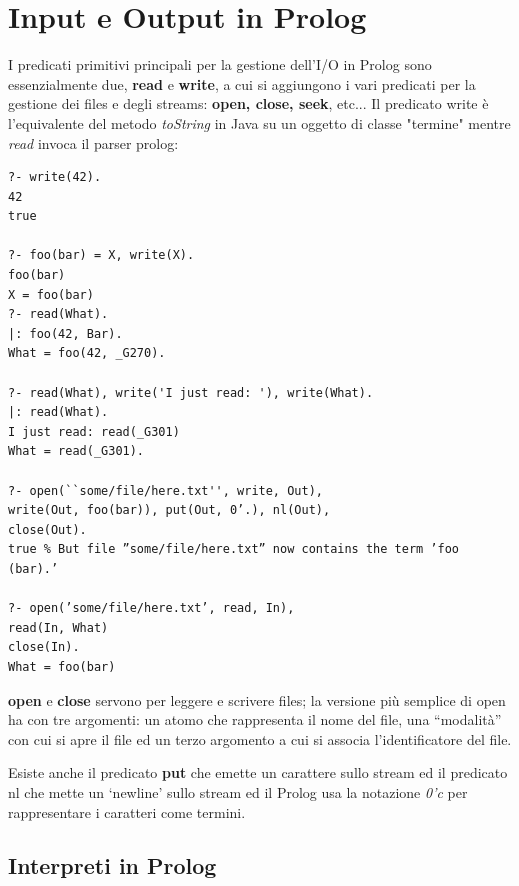 \documentclass[a4paper]{report}
\begin{document}
\section{Input e Output in Prolog}
I predicati primitivi principali per la gestione dell'I/O in Prolog sono essenzialmente due, \textbf{read} e \textbf{write},
a cui si aggiungono i vari predicati per la gestione dei files e degli streams: \textbf{open, close, seek}, etc...
Il predicato write è l'equivalente del metodo \emph{toString} in Java su un oggetto di classe "termine" mentre \emph{read} invoca il parser prolog:
\begin{shaded}
\begin{verbatim}
?- write(42).
42
true

?- foo(bar) = X, write(X).
foo(bar)
X = foo(bar)
?- read(What).
|: foo(42, Bar).
What = foo(42, _G270).

?- read(What), write('I just read: '), write(What).
|: read(What).
I just read: read(_G301)
What = read(_G301).

?- open(``some/file/here.txt'', write, Out),
write(Out, foo(bar)), put(Out, 0’.), nl(Out),
close(Out).
true % But file ”some/file/here.txt” now contains the term ’foo
(bar).’

?- open(’some/file/here.txt’, read, In),
read(In, What)
close(In).
What = foo(bar)
\end{verbatim}
\end{shaded}
\textbf{open} e \textbf{close} servono per leggere e scrivere files; la versione più semplice di open ha con tre argomenti:
un atomo che rappresenta il nome del file, una “modalità” con cui si apre il file ed un terzo argomento a cui si associa l’identificatore del file.

Esiste anche il predicato \textbf{put} che emette un carattere sullo stream ed il predicato nl che mette un ‘newline’ sullo stream
ed il Prolog usa la notazione \textit{0'c} per rappresentare i caratteri come termini.
\subsection{Interpreti in Prolog}
\end{document}
